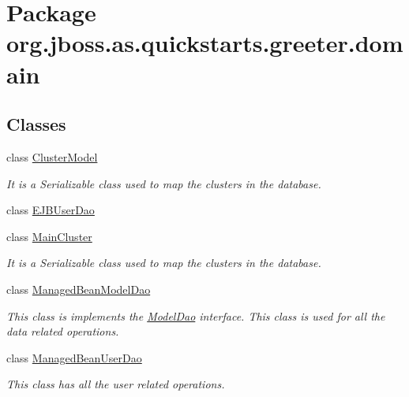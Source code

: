 \hypertarget{namespaceorg_1_1jboss_1_1as_1_1quickstarts_1_1greeter_1_1domain}{}\section{Package org.\+jboss.\+as.\+quickstarts.\+greeter.\+domain}
\label{namespaceorg_1_1jboss_1_1as_1_1quickstarts_1_1greeter_1_1domain}
\subsection*{Classes}
\begin{DoxyCompactItemize}
\item 
class \hyperlink{classorg_1_1jboss_1_1as_1_1quickstarts_1_1greeter_1_1domain_1_1_cluster_model}{Cluster\+Model}
\begin{DoxyCompactList}\small\item\em It is a Serializable class used to map the clusters in the database. \end{DoxyCompactList}\item 
class \hyperlink{classorg_1_1jboss_1_1as_1_1quickstarts_1_1greeter_1_1domain_1_1_e_j_b_user_dao}{E\+J\+B\+User\+Dao}
\item 
class \hyperlink{classorg_1_1jboss_1_1as_1_1quickstarts_1_1greeter_1_1domain_1_1_main_cluster}{Main\+Cluster}
\begin{DoxyCompactList}\small\item\em It is a Serializable class used to map the clusters in the database. \end{DoxyCompactList}\item 
class \hyperlink{classorg_1_1jboss_1_1as_1_1quickstarts_1_1greeter_1_1domain_1_1_managed_bean_model_dao}{Managed\+Bean\+Model\+Dao}
\begin{DoxyCompactList}\small\item\em This class is implements the \hyperlink{interfaceorg_1_1jboss_1_1as_1_1quickstarts_1_1greeter_1_1domain_1_1_model_dao}{Model\+Dao} interface. This class is used for all the data related operations. \end{DoxyCompactList}\item 
class \hyperlink{classorg_1_1jboss_1_1as_1_1quickstarts_1_1greeter_1_1domain_1_1_managed_bean_user_dao}{Managed\+Bean\+User\+Dao}
\begin{DoxyCompactList}\small\item\em This class has all the user related operations. \end{DoxyCompactList}\item 

\end{DoxyCompactItemize}
